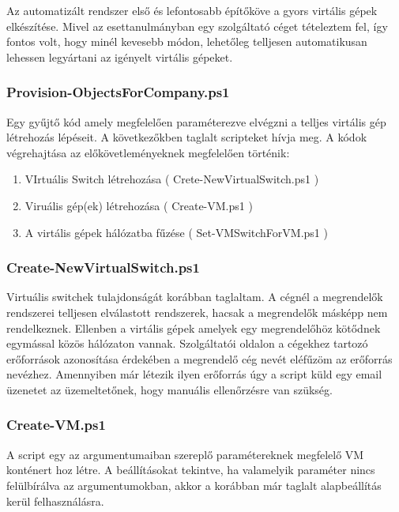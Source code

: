 \documentclass[12pt,oneside,justify]{book}
\begin{document}
Az automatizált rendszer első és lefontosabb építőköve a gyors virtális gépek elkészítése. Mivel az esettanulmányban egy szolgáltató céget tételeztem fel, így fontos volt, hogy minél kevesebb módon, lehetőleg telljesen automatikusan lehessen legyártani az igényelt virtális gépeket. 

\subsubsection{Provision-ObjectsForCompany.ps1}
Egy gyűjtő kód amely megfelelően paraméterezve elvégzni a telljes virtális gép létrehozás lépéseit. 
A következőkben taglalt scripteket hívja meg. 
A kódok végrehajtása az előkövetleményeknek megfelelően történik:
\begin{enumerate}
	\item VIrtuális Switch létrehozása ( Crete-NewVirtualSwitch.ps1 )
	\item Viruális gép(ek) létrehozása ( Create-VM.ps1 )
	\item A virtális gépek hálózatba fűzése ( Set-VMSwitchForVM.ps1 )
\end{enumerate}


\subsubsection{Create-NewVirtualSwitch.ps1}

Virtuális switchek tulajdonságát korábban taglaltam. A cégnél a megrendelők rendszerei telljesen elválastott rendszerek, hacsak a megrendelők másképp nem rendelkeznek. Ellenben a virtális gépek amelyek egy megrendelőhöz kötődnek egymással közös hálózaton vannak. Szolgáltatói oldalon a cégekhez tartozó erőforrások azonosítása érdekében a megrendelő cég nevét eléfűzöm az erőforrás nevézhez. Amennyiben már létezik ilyen erőforrás úgy a script küld egy email üzenetet az üzemeltetőnek, hogy manuális ellenőrzésre van szükség.


\subsubsection{Create-VM.ps1}

A script egy az argumentumaiban szereplő paramétereknek megfelelő VM konténert hoz létre. A beállításokat tekintve, ha valamelyik paraméter nincs felülbírálva az argumentumokban, akkor a korábban már taglalt alapbeállítás kerül felhasználásra.
\end{document}

